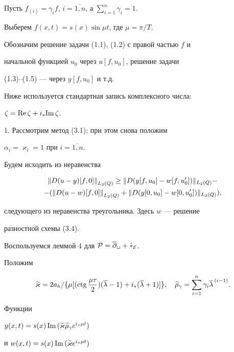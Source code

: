 Пусть $f_{(i)}=\gamma_if$, $i=\overline{1,n}$, а $\sum_{i=1}^n\gamma_i=1$.


Выберем $f(x,t)=s(x)\sin\mu t$, где $\mu=\pi/T$.


Обозначим решение задачи (1.1), (1.2) с правой частью $f$ и


начальной функцией $u_0$ через $u[f,u_0]$, решение задачи


(1.3)--(1.5) --- через $y[f,u_0]$ и т.д.





Ниже используется стандартная запись комплексного числа:


$\zeta=\text{Re\,} \zeta+i_*\text{Im\,}\zeta$.





1. Рассмотрим метод (3.1); при этом снова положим 


$\alpha_i=\varkappa_i=1$ при $i=\overline{1,n}$.


Будем исходить из неравенства


\begin{gather}


\nord u y f 0\ge\ver D(y[f,u_0]-w[f,u_0'])\ver_{L_2(Q)}-\notag \\


-(\nord u w f 0 +\ver D(y[0,u_0]-w[0,u_0'])\ver_{L_2(Q)}),


\end{gather}


следующего из неравенства треугольника. Здесь $w$ --- решение


разностной схемы (3.4).





Воспользуемся леммой 4 для $\cal P=\overline\partial_t+\Dot\Lambda_E$. 


Положим


$$


\widetilde\varkappa=2a_h/\{\mu[(\ctg\frac{\mu\tau}{2})


(\overline\lambda-1)+i_*(\overline\lambda+1)]\},\quad


\widetilde\rho_\gamma=\sum_{i=1}^n\gamma_i\overline\lambda^{\,(i-1)}.


$$


Функции 


$y(x,t)=s(x)\text{\,Im\,}(\widetilde\varkappa\widetilde\rho_\gamma e^{i_*\mu t})$ 


и $w(x,t)=s(x)\text{\,Im\,}(\widetilde\varkappa e^{i_*\mu t})$


